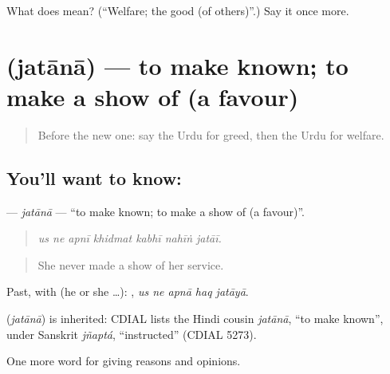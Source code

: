 \begin{tcolorbox}[breakable,colback=teal!4,colframe=teal!35!black,title={Before you move on}]
What does  mean? (\textquotedblleft{}Welfare; the good (of others)\textquotedblright{}.) Say it once more.
\end{tcolorbox}
\section[\texorpdfstring{\ur{جتانا} (jatānā)}{جتانا (jatānā)}]{ (jatānā) — to make known; to make a show of (a favour)}

\label{lesson:UR-C346-jatana}



\begin{quote}
Before the new one: say the Urdu for greed, then the Urdu for welfare.
\end{quote}

\subsection*{You'll want to know: }
\textbf{} — \emph{jatānā} — \textquotedblleft{}to make known; to make a show of (a favour)\textquotedblright{}.

\begin{quote}
      
\end{quote}

\begin{quote}
\emph{us ne apnī khidmat kabhī nahīṅ jatāī.}
\end{quote}

\begin{quote}
She never made a show of her service.
\end{quote}

Past, with  (he or she …):     , \emph{us ne apnā haq jatāyā}.

\begin{cousinweb}
\textbf{} (\emph{jatānā}) is inherited: CDIAL lists the Hindi cousin \emph{jatānā}, \textquotedblleft{}to make known\textquotedblright{}, under Sanskrit \emph{jñaptá}, \textquotedblleft{}instructed\textquotedblright{} (CDIAL 5273).
\end{cousinweb}

\begin{grammarlens}[title={What you've built}]
One more word for giving reasons and opinions.
\end{grammarlens}

